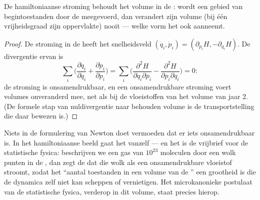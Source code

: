\begin{theorem}\label{thm:b3:hamiltonian-mechanics:liouville}
De hamiltoniaanse stroming behoudt het volume in de : wordt een
gebied van begintoestanden door de  meegevoerd,
dan verandert zijn volume (bij één vrijheidsgraad zijn oppervlakte) nooit
--- welke vorm het ook aanneemt.
\end{theorem}

\begin{proof}
De stroming in de  heeft het snelheidsveld $(\dot q_i, \dot p_i) =
(\partial_{p_i}H, -\partial_{q_i}H)$. De divergentie ervan is
\[
\sum_i\Big(\frac{\partial\dot q_i}{\partial q_i}
 + \frac{\partial\dot p_i}{\partial p_i}\Big)
 = \sum_i\Big(\frac{\partial^2H}{\partial q_i\partial p_i}
 - \frac{\partial^2H}{\partial p_i\partial q_i}\Big) = 0 :
\]
de stroming is onsamendrukbaar, en een onsamendrukbare stroming voert
volumes onveranderd mee, net als bij de vloeistoffen van het volume van
jaar 2. (De formele stap van nuldivergentie naar behouden volume is de
transportstelling die daar bewezen is.)
\end{proof}

\begin{remark}\label{rem:b3:hamiltonian-mechanics:liouville-matters}
Niets in de formulering van Newton doet vermoeden dat er iets
onsamendrukbaar is. In het hamiltoniaanse beeld gaat het vanzelf --- en
het is de vrijbrief voor de statistische fysica: beschrijven we een gas
van $10^{23}$ moleculen door een wolk punten in de , dan zegt
de  dat die wolk als een onsamendrukbare vloeistof
stroomt, zodat het ``aantal toestanden in een volume van de ''
een grootheid is die de dynamica zelf niet kan scheppen of vernietigen.
Het microkanonieke postulaat van de statistische fysica, verderop in dit
volume, staat precies hierop.
\end{remark}

